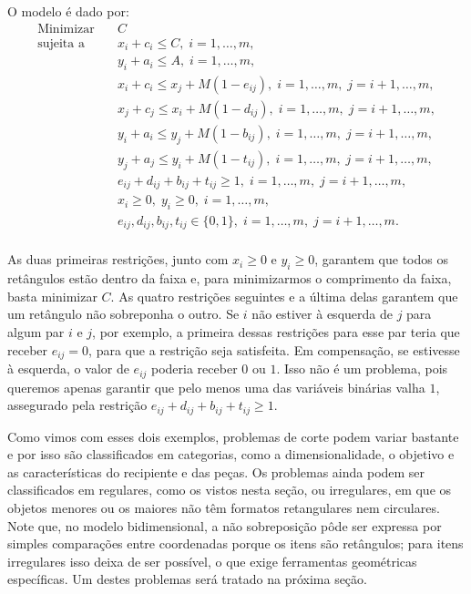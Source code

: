 \documentclass{article}
\begin{document}
O modelo é dado por:
\begin{equation*}
   \begin{aligned}
    \textrm{Minimizar} \quad & C\\
    \textrm{sujeita a} \quad & x_i + c_i \leq C, \; i = 1, \dots, m,\\
        & y_i + a_i \leq A, \; i = 1, \dots, m, \\
        & x_i + c_i \leq x_j + M(1-e_{ij}), \;i = 1, \dots, m, \;j = i+1, \dots, m,\\
        & x_j + c_j \leq x_i + M(1-d_{ij}), \;i = 1, \dots, m, \;j = i+1, \dots, m,\\
        & y_i + a_i \leq y_j + M(1-b_{ij}), \;i = 1, \dots, m, \;j = i+1, \dots, m,\\
        & y_j + a_j \leq y_i + M(1-t_{ij}), \;i = 1, \dots, m, \;j = i+1, \dots, m, \\
        & e_{ij} + d_{ij} + b_{ij} + t_{ij} \geq 1, \;i = 1, \dots, m, \;j = i+1, \dots, m, \\
        &x_i \geq 0, \; y_i \geq 0, \;i = 1, \dots, m,\\
        &e_{ij}, d_{ij}, b_{ij}, t_{ij} \in \{0,1\}, \;i = 1, \dots, m, \;j = i+1, \dots, m.\\
    \end{aligned}
\end{equation*}

As duas primeiras restrições, junto com $x_i \geq 0$ e $y_i \geq 0$, garantem que todos os retângulos estão dentro da faixa e, para minimizarmos o comprimento da faixa, basta minimizar $C$. As quatro restrições seguintes e a última delas garantem que um retângulo não sobreponha o outro. Se $i$ não estiver à esquerda de $j$ para algum par $i$ e $j$, por exemplo, a primeira dessas restrições para esse par teria que receber $e_{ij} = 0$, para que a restrição seja satisfeita. Em compensação, se estivesse à esquerda, o valor de $e_{ij}$ poderia receber $0$ ou $1$. Isso não é um problema, pois queremos apenas garantir que pelo menos uma das variáveis binárias valha $1$, assegurado pela restrição $e_{ij} + d_{ij} + b_{ij} + t_{ij} \geq 1$.

Como vimos com esses dois exemplos, problemas de corte podem variar bastante e por isso são classificados em categorias, como a dimensionalidade, o objetivo e as características do recipiente e das peças. Os problemas ainda podem ser classificados em regulares, como os vistos nesta seção, ou irregulares, em que os objetos menores ou os maiores não têm formatos retangulares nem circulares. Note que, no modelo bidimensional, a não sobreposição pôde ser expressa por simples comparações entre coordenadas porque os itens são retângulos; para itens irregulares isso deixa de ser possível, o que exige ferramentas geométricas específicas. Um destes problemas será tratado na próxima seção.
\end{document}
